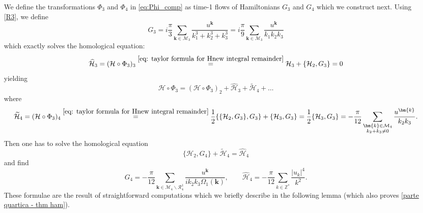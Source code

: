 \documentclass[a4paper,10pt,reqno]{article}
\theoremstyle{definition}
\theoremstyle{plain}
\theoremstyle{plain}
\theoremstyle{definition}
\theoremstyle{plain}
\theoremstyle{plain}
\theoremstyle{plain}
\theoremstyle{definition}
\theoremstyle{definition}
\def \Z{\mathbb Z}
\def \H{\mathcal{H}}
\def \M{\mathcal{M}}
\def \k{\bm{k}}
\def \j{\bm{j}}
\begin{document}
We define the transformations $\Phi_3$ and $\Phi_4$ in \eqref{eq:Phi_comp} as time-1 flows of Hamiltonians $G_3$ and $G_4$ which we construct next. 
Using \eqref{R3}, we define
\begin{equation}\label{G3}
G_3 = i \frac{\pi}{3} \sum_{\k \in \M_3} \frac{u^{\k}}{k_1^3 +k_2^3 +k_3^3} = i \frac{\pi}{9} \sum_{\k \in \M_3} \frac{u^{\k}}{k_1k_2k_3}
\end{equation}
which exactly solves the homological equation:
\[
\widehat{\H}_3 = (\H \circ\Phi_3)_3 \stackrel{\eqref{eq: taylor formula for Hnew integral remainder}}{=} \H_3 + \{ \H_2 , G_3 \} = 0
\]
yielding
\[
\H\circ\Phi_3 = (\H\circ\Phi_3)_2 +  \widehat{\H}_3+ \widetilde{\H}_4 + \ldots
\]
where
\[
\widetilde{\H}_4 = (\H\circ\Phi_3)_4 \stackrel{\eqref{eq: taylor formula for Hnew integral remainder}}{=} \frac{1}{2} \{ \{ \H_2,G_3 \},G_3 \} + \{ \H_3,G_3 \} = \frac{1}{2} \{ \H_3,G_3 \} = -\frac{\pi}{12} \sum_{\substack{ \k \in \M_4 \\ k_2+k_3 \neq 0}}  \frac{u^{\k}}{k_2 k_3}.
\]
Then one has to solve the homological equation
\[
\{ \H_2 , G_4 \} + \widetilde{\H}_4 = \widehat{\H}_4
\]
and find 
\begin{equation}\label{G4}
G_4 = -\frac{\pi}{12} \sum_{\k \in \M_4 \smallsetminus \mathcal{R}_4^1}  \frac{u^{\k}}{i k_2 k_3 \Omega_1(\k)}, \qquad \widehat{\H}_4 = -\frac{\pi}{12} \sum_{k \in \Z^*} \frac{|u_k|^4}{k^2}.
\end{equation}
These formulae are the result of straightforward computations which we briefly describe in the following lemma (which also proves \eqref{parte quartica - thm ham}).
\end{document}
